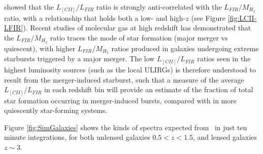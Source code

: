 showed that the $L_{[CII]}/L_{FIR}$ ratio
is strongly anti-correlated with the $L_{FIR}/M_{H_2}$ ratio, with a
relationship that holds both a low- and high-$z$ (see Figure
\ref{fig:LCII-LFIR}).  Recent studies of molecular gas at high
redshift has demonstrated that the $L_{FIR}/M_{H_2}$ ratio traces the
mode of star formation (major merger vs quiescent), with higher
$L_{FIR}/M_{H_2}$ ratios produced in galaxies undergoing extreme
starbursts triggered by a major merger. The low $L_{[CII]}/L_{FIR}$
ratios seen in the highest luminosity sources (such as the local
ULIRGs) is therefore understood to result from the merger-induced
starburst, such that a measure of the average $L_{[CII]}/L_{FIR}$ in
each redshift bin will provide an estimate of the fraction of total
star formation occurring in merger-induced bursts, compared with in
more quiescently star-forming systems.

Figure \ref{fig:SimGalaxies} shows the kinds of spectra expected from \name\ in just ten minute integrations, for both unlensed galaxies $0.5 < z < 1.5$, and lensed galaxies $z\sim3$.


